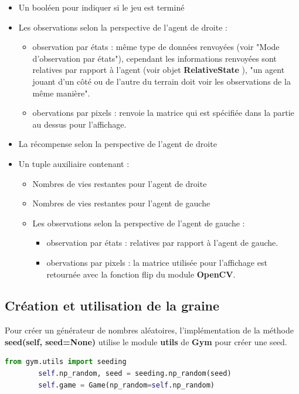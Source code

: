 \documentclass[11pt, a4paper]{article}
\begin{document}
\begin{itemize}
	\item Un booléen pour indiquer si le jeu est terminé
	\item Les observations selon la perspective de l'agent de droite : 
		\begin{itemize}
			\item observation par états : même type de données renvoyées (voir "Mode d'observation par états"), cependant les informations renvoyées sont relatives par rapport à l'agent (voir objet 
			\textbf{RelativeState} \cite{slimevolley.py}), 
			"un agent jouant d'un côté ou de l'autre du terrain doit voir les observations de la même manière".
			\item obervations par pixels : renvoie la matrice qui est spécifiée dans la partie au dessus pour l'affichage.
		\end{itemize}
	\item La récompense selon la perspective de l'agent de droite
	\item Un tuple auxiliaire contenant :
		\begin{itemize}
		\item Nombres de vies restantes pour l'agent de droite
		\item Nombres de vies restantes pour l'agent de gauche
		\item Les observations selon la perspective de l'agent de gauche :
		 \begin{itemize}
			\item observation par états : relatives par rapport à l'agent de gauche.
			\item obervations par pixels : la matrice utilisée pour l'affichage est retournée avec la fonction flip du module \textbf{OpenCV}.
		 \end{itemize}
		\end{itemize}
	
	
\end{itemize}

\subsection{\textbf{Création et utilisation de la graine}} 

\noindent Pour créer un générateur de nombres aléatoires, l'implémentation de la méthode \textbf{seed(self, seed=None)} utilise le module \textbf{utils} de \textbf{Gym} pour créer une seed. \\

\begin{lstlisting}[language=python, frame=single, gobble=4, tabsize=4]	
	from gym.utils import seeding
		self.np_random, seed = seeding.np_random(seed)
		self.game = Game(np_random=self.np_random)
\end{lstlisting}
\end{document}
